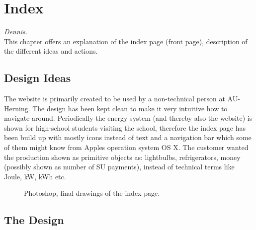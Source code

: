 \newpage
\chapter{Index}\textit{Dennis.}\\
This chapter offers an explanation of the index page (front page),  description of the different ideas and actions.  
\section{Design Ideas}
The website is primarily created to be used by a non-technical person at AU-Herning. The design has been kept clean to make it very intuitive how to navigate around. Periodically the energy system (and thereby also the website) is shown for high-school students visiting the school, therefore the index page has been build up with mostly icons instead of text and a navigation bar which some of them might know from Apples operation system OS X. The customer wanted the production shown as primitive objects as: lightbulbs, refrigerators, money (possibly shown as number of SU payments), instead of technical terms like Joule, kW, kWh etc.
\begin{figure}[h!]
	\center
		\setlength\fboxsep{0pt}
		\setlength\fboxrule{1pt}
   	\caption{Photoshop, final drawings of the index page.}
   	\label{fig:index_page_design}
\end{figure}
\section{The Design}

